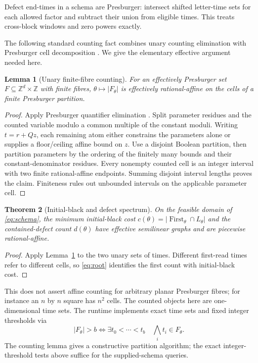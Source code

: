 \documentclass[11pt]{article}
\newtheorem{theorem}{Theorem}[section]
\newtheorem{lemma}[theorem]{Lemma}
\theoremstyle{remark}\newtheorem{remark}[theorem]{Remark}
\newcommand{\Z}{\mathbb Z}\newcommand{\N}{\mathbb N}
\begin{document}
Defect end-times in a schema are Presburger: intersect shifted letter-time
sets for each allowed factor and subtract their union from eligible times.
This treats cross-block windows and zero powers exactly.

The following standard counting fact combines unary counting elimination
\cite[Theorem~5.4]{counting} with Presburger cell decomposition
\cite[Theorem~1]{cluckers}. We give the elementary effective argument needed here.
\begin{lemma}[Unary finite-fibre counting]\label{lem:count}
For an effectively Presburger set $F\subseteq\Z^d\times\Z$ with finite fibres,
$\theta\mapsto |F_\theta|$ is effectively rational-affine on the cells of a
finite Presburger partition.
\end{lemma}
\begin{proof}
Apply Presburger quantifier elimination \cite{haase}. Split parameter residues
and the counted variable modulo a common multiple of the constant moduli.
Writing $t=r+Qz$, each remaining atom either constrains the parameters alone
or supplies a floor/ceiling affine bound on $z$. Use a disjoint Boolean
partition, then partition parameters by the ordering of the finitely many bounds
and their constant-denominator residues. Every nonempty counted cell is an
integer interval with two finite rational-affine endpoints. Summing disjoint
interval lengths proves the claim. Finiteness rules out unbounded intervals
on the applicable parameter cell.
\end{proof}

\begin{theorem}[Initial-black and defect spectrum]\label{thm:spectrum}
On the feasible domain of \eqref{eq:schema}, the minimum initial-black cost
$c(\theta)=|\operatorname{First}_\theta\cap L_\theta|$ and the contained-defect
count $d(\theta)$ have effective semilinear graphs and are piecewise
rational-affine.
\end{theorem}
\begin{proof}
Apply Lemma~\ref{lem:count} to the two unary sets of times. Different first-read
times refer to different cells, so \eqref{eq:root} identifies the first count
with initial-black cost.
\end{proof}

This does not assert affine counting for arbitrary planar Presburger fibres;
for instance an $n$ by $n$ square has $n^2$ cells. The counted objects here are
one-dimensional time sets. The runtime implements exact time sets and fixed
integer thresholds via
\[
 |F_\theta|>b\iff\exists t_0<\cdots<t_b\quad\bigwedge_i t_i\in F_\theta.
\]
The counting lemma gives a constructive partition algorithm; the exact
integer-threshold tests above suffice for the supplied-schema queries.
\end{document}
